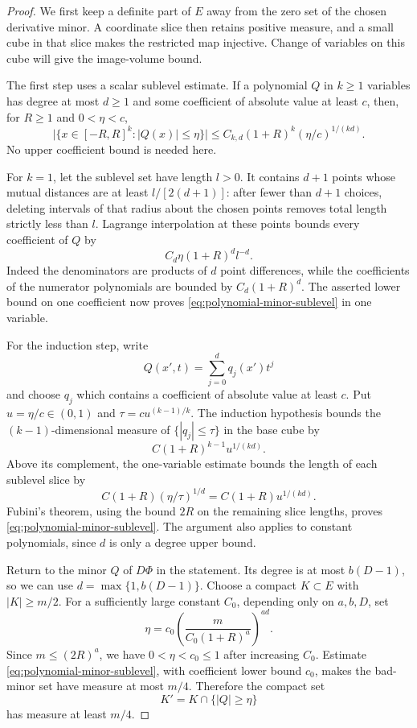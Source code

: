 \begin{proof}
We first keep a definite part of $E$ away from the zero set of the
chosen derivative minor.  A coordinate slice then retains positive
measure, and a small cube in that slice makes the restricted map
injective.  Change of variables on this cube will give the image-volume
bound.

The first step uses a scalar sublevel estimate.  If a polynomial $Q$ in $k\ge1$
variables has degree at most $d\ge1$ and some coefficient of absolute
value at least $c$, then, for $R\ge1$ and $0<\eta<c$,
\begin{equation}
\label{eq:polynomial-minor-sublevel}
 \big|\{x\in[-R,R]^k:|Q(x)|\le\eta\}\big|
 \le C_{k,d}(1+R)^k(\eta/c)^{1/(kd)}.
\end{equation}
No upper coefficient bound is needed here.

For $k=1$, let the sublevel set have length $l>0$.  It contains
$d+1$ points whose mutual distances are at least $l/[2(d+1)]$:
after fewer than $d+1$ choices, deleting intervals of that radius
about the chosen points removes total length strictly less than $l$.
Lagrange interpolation at these points bounds every coefficient of
$Q$ by
\[
 C_d\eta(1+R)^d l^{-d}.
\]
Indeed the denominators are products of $d$ point differences, while
the coefficients of the numerator polynomials are bounded by
$C_d(1+R)^d$.  The asserted lower bound on one coefficient now proves
\eqref{eq:polynomial-minor-sublevel} in one variable.

For the induction step, write
\[
 Q(x',t)=\sum_{j=0}^d q_j(x')t^j
\]
and choose $q_j$ which contains a coefficient of absolute value at
least $c$.  Put $u=\eta/c\in(0,1)$ and
$\tau=c u^{(k-1)/k}$.  The induction hypothesis bounds the
$(k-1)$-dimensional measure of $\{|q_j|\le\tau\}$ in the base cube
by
\[
 C(1+R)^{k-1}u^{1/(kd)}.
\]
Above its complement, the one-variable estimate bounds the length of
each sublevel slice by
\[
 C(1+R)(\eta/\tau)^{1/d}
   =C(1+R)u^{1/(kd)}.
\]
Fubini's theorem, using the bound $2R$ on the remaining slice
lengths, proves \eqref{eq:polynomial-minor-sublevel}.  The argument
also applies to constant polynomials, since $d$ is only a degree
upper bound.

Return to the minor $Q$ of $D\Phi$ in the statement.  Its degree is at
most $b(D-1)$, so we can use
$d=\max\{1,b(D-1)\}$.  Choose a compact $K\subset E$ with
$|K|\ge m/2$.  For a sufficiently large constant $C_0$, depending
only on $a,b,D$, set
\[
 \eta=c_0\left(\frac{m}{C_0(1+R)^a}\right)^{ad}.
\]
Since $m\le(2R)^a$, we have $0<\eta<c_0\le1$ after increasing
$C_0$.  Estimate \eqref{eq:polynomial-minor-sublevel}, with coefficient
lower bound $c_0$, makes the bad-minor set have measure at most
$m/4$.  Therefore the compact set
\[
 K'=K\cap\{|Q|\ge\eta\}
\]
has measure at least $m/4$.


\end{proof}
